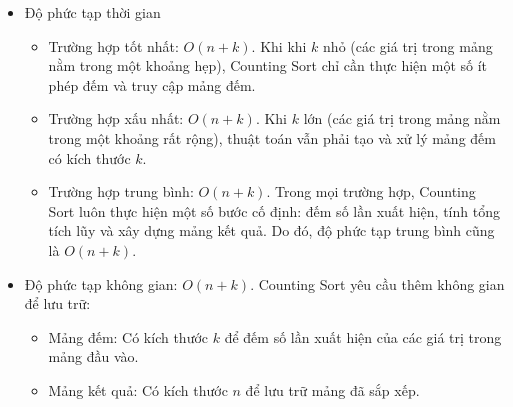 \begin{itemize}
	\item Độ phức tạp thời gian
	\begin{itemize}[label=$\circ$]
		\item Trường hợp tốt nhất: $O\left(n+k\right)$. Khi khi $k$ nhỏ 
		(các giá trị trong mảng nằm trong một khoảng hẹp), Counting Sort 
		chỉ cần thực hiện một số ít phép đếm và truy cập mảng đếm.
		\item Trường hợp xấu nhất: $O\left(n+k\right)$. Khi $k$ lớn (các 
		giá trị trong mảng nằm trong một khoảng rất rộng), thuật toán 
		vẫn phải tạo và xử lý mảng đếm có kích thước $k$.
		\item Trường hợp trung bình: $O\left(n+k\right)$. Trong mọi 
		trường hợp, Counting Sort luôn thực hiện một số bước cố định: 
		đếm số lần xuất hiện, tính tổng tích lũy và xây dựng mảng kết quả. 
		Do đó, độ phức tạp trung bình cũng là $O(n+k)$. 
	\end{itemize}
	\item Độ phức tạp không gian: $O\left(n+k\right)$. Counting Sort 
	yêu cầu thêm không gian để lưu trữ:
	\begin{itemize}[label=$\circ$]
		\item Mảng đếm: Có kích thước $k$ để đếm số lần xuất hiện của 
		các giá trị trong mảng đầu vào.
		\item Mảng kết quả: Có kích thước $n$ để lưu trữ mảng đã sắp xếp.
	\end{itemize}
\end{itemize}